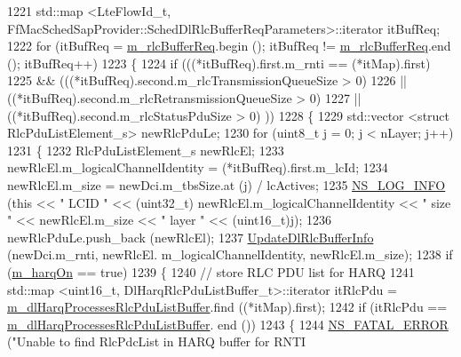 \begin{DoxyCode}
1221       std::map <LteFlowId\_t, FfMacSchedSapProvider::SchedDlRlcBufferReqParameters>::iterator itBufReq;
1222       \textcolor{keywordflow}{for} (itBufReq = \hyperlink{classns3_1_1FdMtFfMacScheduler_ae9400017a91705970fdac7566ae54374}{m\_rlcBufferReq}.begin (); itBufReq != 
      \hyperlink{classns3_1_1FdMtFfMacScheduler_ae9400017a91705970fdac7566ae54374}{m\_rlcBufferReq}.end (); itBufReq++)
1223         \{
1224           \textcolor{keywordflow}{if} (((*itBufReq).first.m\_rnti == (*itMap).first)
1225               && (((*itBufReq).second.m\_rlcTransmissionQueueSize > 0)
1226                   || ((*itBufReq).second.m\_rlcRetransmissionQueueSize > 0)
1227                   || ((*itBufReq).second.m\_rlcStatusPduSize > 0) ))
1228             \{
1229               std::vector <struct RlcPduListElement\_s> newRlcPduLe;
1230               \textcolor{keywordflow}{for} (uint8\_t j = 0; j < nLayer; j++)
1231                 \{
1232                   RlcPduListElement\_s newRlcEl;
1233                   newRlcEl.m\_logicalChannelIdentity = (*itBufReq).first.m\_lcId;
1234                   newRlcEl.m\_size = newDci.m\_tbsSize.at (j) / lcActives;
1235                   \hyperlink{group__logging_gafbd73ee2cf9f26b319f49086d8e860fb}{NS\_LOG\_INFO} (\textcolor{keyword}{this} << \textcolor{stringliteral}{" LCID "} << (uint32\_t) newRlcEl.m\_logicalChannelIdentity 
      << \textcolor{stringliteral}{" size "} << newRlcEl.m\_size << \textcolor{stringliteral}{" layer "} << (uint16\_t)j);
1236                   newRlcPduLe.push\_back (newRlcEl);
1237                   \hyperlink{classns3_1_1FdMtFfMacScheduler_a1bad31471d661c8279eaf9ab2672e334}{UpdateDlRlcBufferInfo} (newDci.m\_rnti, newRlcEl.
      m\_logicalChannelIdentity, newRlcEl.m\_size);
1238                   \textcolor{keywordflow}{if} (\hyperlink{classns3_1_1FdMtFfMacScheduler_abc95b8f62ff797ff3fb9ed21322c5f35}{m\_harqOn} == \textcolor{keyword}{true})
1239                     \{
1240                       \textcolor{comment}{// store RLC PDU list for HARQ}
1241                       std::map <uint16\_t, DlHarqRlcPduListBuffer\_t>::iterator itRlcPdu =  
      \hyperlink{classns3_1_1FdMtFfMacScheduler_a156b4cd10f41dd79e446a42c469fee02}{m\_dlHarqProcessesRlcPduListBuffer}.find ((*itMap).first);
1242                       \textcolor{keywordflow}{if} (itRlcPdu == \hyperlink{classns3_1_1FdMtFfMacScheduler_a156b4cd10f41dd79e446a42c469fee02}{m\_dlHarqProcessesRlcPduListBuffer}.
      end ())
1243                         \{
1244                           \hyperlink{group__fatal_ga5131d5e3f75d7d4cbfd706ac456fdc85}{NS\_FATAL\_ERROR} (\textcolor{stringliteral}{"Unable to find RlcPdcList in HARQ buffer for RNTI 
}
\end{DoxyCode}
